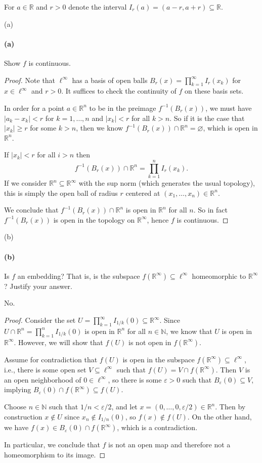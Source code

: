 \documentclass[12pt]{article}
\newlength{\myparskip}
\newenvironment{fullbox}{\begin{lrbox}{\savefullbox}\begin{minipage}{\dimexpr\textwidth-2\fboxsep\relax}\setlength{\parskip}{\myparskip}}{\end{minipage}\end{lrbox}\framebox[\textwidth]{\usebox{\savefullbox}}}
\newenvironment{pbox}[1][]{\begin{fullbox}\ifx#1\empty\else\paragraph{#1}\phantom{}\fi}{\end{fullbox}}
\theoremstyle{definition}
\newcommand{\N}{\mathbb{N}}
\newcommand{\R}{\mathbb{R}}
\newcommand{\eps}{\varepsilon}
\renewcommand{\emptyset}{\varnothing}
\newcommand{\<}{\langle}
\renewcommand{\>}{\rangle}
\begin{document}
For $a \in \R$ and $r > 0$ denote the interval $I_r(a) = (a - r, a + r) \subseteq \R$.




\begin{pbox}[(a)]
    Show $f$ is continuous.
\end{pbox}

\begin{proof}
    Note that $\ell^\infty$ has a basis of open balls $B_r(x) = \prod_{k=1}^{\infty} I_r(x_k)$ for $x \in \ell^\infty$ and $r > 0$.
    It suffices to check the continuity of $f$ on these basis sets.

    In order for a point $a \in \R^n$ to be in the preimage $f^{-1}(B_r(x))$, we must have $|a_k - x_k| < r$ for $k = 1, \dots, n$ and $|x_k| < r$ for all $k > n$.
    So if it is the case that $|x_k| \geq r$ for some $k > n$, then we know $f^{-1}(B_r(x)) \cap \R^n = \emptyset$, which is open in $\R^n$.

    If $|x_k| < r$ for all $i > n$ then
    \[\textstyle
        f^{-1}(B_r(x)) \cap \R^n = \prod_{k=1}^{n} I_r(x_k).
    \]
    If we consider $\R^n \subseteq \R^\infty$ with the sup norm (which generates the usual topology), this is simply the open ball of radius $r$ centered at $(x_1, \dots, x_n) \in \R^n$.

    We conclude that $f^{-1}(B_r(x)) \cap \R^n$ is open in $\R^n$ for all $n$.
    So in fact $f^{-1}(B_r(x))$ is open in the topology on $\R^\infty$, hence $f$ is continuous.
\end{proof}

\begin{pbox}[(b)]
    Is $f$ an embedding?
    That is, is the subspace $f(\R^\infty) \subseteq \ell^\infty$ homeomorphic to $\R^\infty$?
    Justify your answer.
\end{pbox}

No.

\begin{proof}
    Consider the set $U = \prod_{k=1}^{\infty} I_{1/k}(0) \subseteq \R^\infty$.
    Since $U \cap \R^n = \prod_{k=1}^{n} I_{1/k}(0)$ is open in $\R^n$ for all $n \in \N$, we know that $U$ is open in $\R^\infty$.
    However, we will show that $f(U)$ is not open in $f(\R^\infty)$.

    Assume for contradiction that $f(U)$ is open in the subspace $f(\R^\infty) \subseteq \ell^\infty$, i.e., there is some open set $V \subseteq \ell^\infty$ such that $f(U) = V \cap f(\R^\infty)$.
    Then $V$ is an open neighborhood of $0 \in \ell^\infty$, so there is some $\eps > 0$ such that $B_\eps(0) \subseteq V$, implying $B_\eps(0) \cap f(\R^\infty) \subseteq f(U)$.
    
    Choose $n \in \N$ such that $1/n < \eps/2$, and let $x = (0, \dots, 0, \eps/2) \in \R^n$.
    Then by construction $x \notin U$ since $x_n \notin I_{1/n}(0)$, so $f(x) \notin f(U)$. On the other hand, we have $f(x) \in B_\eps(0) \cap f(\R^\infty)$, which is a contradiction.

    In particular, we conclude that $f$ is not an open map and therefore not a homeomorphism to its image.
\end{proof}
\end{document}
